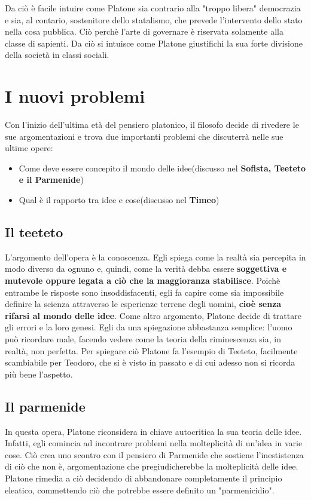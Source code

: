 \documentclass[10pt,a4paper]{article}
\begin{document}
Da ciò è facile intuire come Platone sia contrario alla "troppo libera" democrazia e sia, al contario, sostenitore dello statalismo, che prevede l'intervento dello stato nella cosa pubblica. Ciò perchè l'arte di governare è riservata solamente  alla classe di sapienti. Da ciò si intuisce come Platone giustifichi la sua forte divisione della società in classi sociali.

\section{I nuovi problemi}

Con l'inizio dell'ultima età del pensiero platonico, il filosofo decide di rivedere le sue argomentazioni e trova due importanti problemi che discuterrà nelle sue ultime opere:
\begin{itemize}
	\item Come deve essere concepito il mondo delle idee(discusso nel \textbf{Sofista, Teeteto e il Parmenide})
	\item Qual è il rapporto tra idee e cose(discusso nel \textbf{Timeo})
\end{itemize}

\subsection{Il teeteto}

L'argomento dell'opera è la conoscenza. Egli spiega come la realtà sia percepita in modo diverso da ognuno e, quindi, come la verità debba essere \textbf{soggettiva e mutevole oppure legata a ciò che la maggioranza stabilisce}. Poichè entrambe le risposte sono insoddisfacenti, egli fa capire come sia impossibile definire la scienza attraverso le esperienze terrene degli uomini, \textbf{cioè senza rifarsi al mondo delle idee}. Come altro argomento, Platone decide di trattare gli errori e la loro genesi. Egli da una spiegazione abbastanza semplice: l'uomo può ricordare male, facendo vedere come la teoria della riminescenza sia, in realtà, non perfetta. Per spiegare ciò Platone fa l'esempio di Teeteto, facilmente scambiabile per Teodoro, che si è visto in passato e di cui adesso non si ricorda più bene l'aspetto.

\subsection{Il parmenide}

In questa opera, Platone riconsidera in chiave autocritica la sua teoria delle idee. Infatti, egli comincia ad incontrare problemi nella molteplicità di un'idea in varie cose. Ciò crea uno scontro con il pensiero di Parmenide che sostiene l'inestistenza di ciò che non è, argomentazione che pregiudicherebbe la molteplicità delle idee. Platone rimedia a ciò decidendo di abbandonare completamente il principio eleatico, commettendo ciò che potrebbe essere definito un "parmenicidio".
\end{document}
